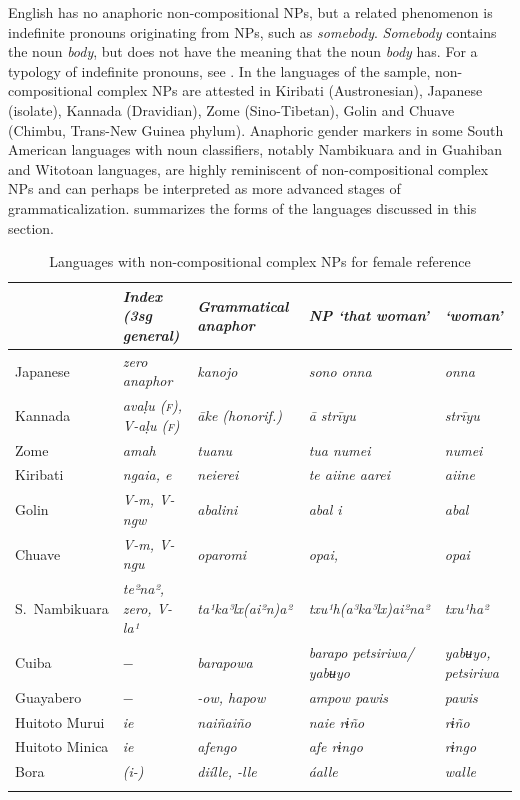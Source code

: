 \documentclass[output=collectionpaper]{langsci/langscibook}
\begin{document}
English has no anaphoric non-compositional NPs, but a related phenomenon is indefinite pronouns originating from NPs, such as \textit{somebody}. \textit{Somebody} contains the noun \textit{body}, but does not have the meaning that the noun \textit{body} has. For a typology of indefinite pronouns, see \citet{Haspelmath1997}. In the languages of the sample, non-compositional complex NPs are attested in Kiribati (Austronesian), Japanese (isolate), Kannada (Dravidian), Zome (Sino-Tibetan), Golin and Chuave (Chimbu, Trans-New Guinea phylum). Anaphoric gender markers in some South American languages with noun classifiers, notably Nambikuara and in Guahiban and Witotoan languages, are highly reminiscent of non-compositional complex NPs and can perhaps be interpreted as more advanced stages of grammaticalization.  summarizes the forms of the languages discussed in this section.

\begin{table}
\begin{tabularx}{\textwidth}{Q>{\itshape}Q>{\itshape}Q>{\itshape}Q>{\itshape}Q}
\lsptoprule
& \normalfont	Index (3sg general)	&	\normalfont Grammatical anaphor	&	\normalfont NP ‘that woman’	&	\normalfont ‘woman’	\\
\midrule
Japanese	&	\normalfont zero anaphor	&	kanojo	&	sono onna	&	onna	\\
Kannada	&	avaḷu {\normalfont (\scshape f)}, {\normalfont V}-aḷu {\normalfont (\scshape f)}	&	āke \normalfont (honorif.)	&	ā strīyu	&	strīyu	\\
Zome	&	amah	&	tuanu	&	tua numei	&	numei	\\
Kiribati	&	ngaia, e	&	neierei	&	te aiine aarei	&	aiine	\\
Golin	&	{\normalfont V}-m, {\normalfont V}-ngw	&	abalini	&	abal i	&	abal	\\
Chuave	&	{\normalfont V}-m, {\normalfont V}-ngu	&	oparomi	&	opai, 	&	opai	\\
S.~Nambikuara	&	te²na², {\normalfont zero}, {\normalfont V}-la¹	&	ta¹ka³lx(ai²n)a²	&	txu¹h(a³ka³lx)ai²na²	&	txu¹ha²	\\
Cuiba	&	$-$	&	barapowa	&	barapo petsiriwa/ yabʉyo	&	yabʉyo, petsiriwa	\\
Guayabero	&	$-$ 	&	-ow, hapow	&	ampow pawis	&	pawis	\\
Huitoto Murui	&	ie	&	naiñaiño	&	naie rɨño	&	rɨño	\\
Huitoto Minica	&	ie	&	afengo	&	afe rɨngo	&	rɨngo	\\
Bora	&	(i-)	&	diílle, -lle	&	áalle	&	walle	\\
\lspbottomrule
\end{tabularx}
\caption{Languages with non-compositional complex NPs for female reference}
\label{tab:BW:8}
\end{table}
\end{document}
